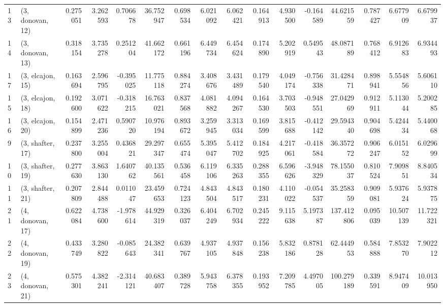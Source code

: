 \begin{tabular}{llrrrrrrrrrrrrrr}
13 &  (3, donovan, 12) &   0.275051 &  3.262593 &  0.706678 &  36.752947 &  0.698534 &   6.021092 &  6.062421 &  0.164913 &  4.930500 & -0.164589 &   44.621559 &  0.787427 &   6.677909 &   6.679937 \\
14 &  (3, donovan, 13) &   0.318154 &  3.735278 &  0.251204 &  41.662172 &  0.661196 &   6.449734 &  6.454624 &  0.174890 &  5.202919 &  0.549543 &   48.087189 &  0.768412 &   6.912683 &   6.934493 \\
17 &  (3, elcajon, 15) &   0.163694 &  2.596795 & -0.395025 &  11.775118 &  0.884274 &   3.408676 &  3.431489 &  0.179540 &  4.049174 & -0.756338 &   31.428471 &  0.898941 &   5.554856 &   5.606110 \\
15 &  (3, elcajon, 18) &   0.192600 &  3.071622 & -0.318215 &  16.763021 &  0.837568 &   4.081882 &  4.094267 &  0.164530 &  3.703503 & -0.948551 &   27.042969 &  0.912911 &   5.113044 &   5.200285 \\
16 &  (3, elcajon, 20) &   0.154899 &  2.471236 &  0.590720 &  10.976194 &  0.893672 &   3.259945 &  3.313034 &  0.169599 &  3.815688 & -0.412142 &   29.594340 &  0.904698 &   5.424434 &   5.440068 \\
9  &  (3, shafter, 17) &   0.237800 &  3.255004 &  0.436821 &  29.297347 &  0.655474 &   5.395047 &  5.412702 &  0.184925 &  4.217061 & -0.418584 &   36.357272 &  0.906247 &   6.015152 &   6.029699 \\
10 &  (3, shafter, 19) &   0.277630 &  3.863130 &  1.640762 &  40.135561 &  0.536458 &   6.119106 &  6.335263 &  0.288355 &  6.596626 & -3.948329 &   78.155037 &  0.810524 &   7.909851 &   8.840534 \\
11 &  (3, shafter, 21) &   0.207809 &  2.844488 &  0.011047 &  23.459653 &  0.724123 &   4.843504 &  4.843517 &  0.180231 &  4.110022 & -0.054537 &   35.258359 &  0.909081 &   5.937624 &   5.937875 \\
21 &  (4, donovan, 17) &   0.622084 &  4.738600 & -1.978614 &  44.929319 &  0.326037 &   6.404249 &  6.702934 &  0.245222 &  9.115638 &  5.197387 &  137.412806 &  0.095039 &  10.507139 &  11.722321 \\
22 &  (4, donovan, 19) &   0.433749 &  3.280822 & -0.085643 &  24.382341 &  0.639767 &   4.937105 &  4.937848 &  0.156238 &  5.832186 &  0.878128 &   62.444953 &  0.584888 &   7.853270 &   7.902212 \\
23 &  (4, donovan, 21) &   0.575301 &  4.382241 & -2.314121 &  40.683407 &  0.389728 &   5.943758 &  6.378355 &  0.193952 &  7.209785 &  4.497005 &  100.279189 &  0.339591 &   8.947409 &  10.013950 \\

\end{tabular}
